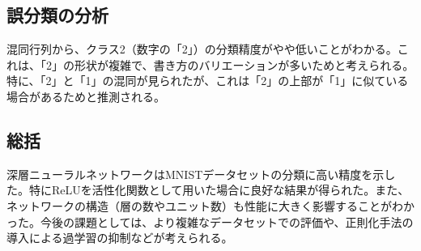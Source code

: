 \documentclass{article}
\begin{document}
\subsection{誤分類の分析}
混同行列から、クラス2（数字の「2」）の分類精度がやや低いことがわかる。これは、「2」の形状が複雑で、書き方のバリエーションが多いためと考えられる。特に、「2」と「1」の混同が見られたが、これは「2」の上部が「1」に似ている場合があるためと推測される。

\subsection{総括}
深層ニューラルネットワークはMNISTデータセットの分類に高い精度を示した。特にReLUを活性化関数として用いた場合に良好な結果が得られた。また、ネットワークの構造（層の数やユニット数）も性能に大きく影響することがわかった。今後の課題としては、より複雑なデータセットでの評価や、正則化手法の導入による過学習の抑制などが考えられる。
\end{document}
